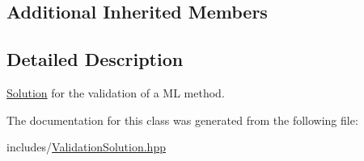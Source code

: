 \subsection*{Additional Inherited Members}


\subsection{Detailed Description}
\hyperlink{class_solution}{Solution} for the validation of a ML method. 

The documentation for this class was generated from the following file\+:\begin{DoxyCompactItemize}
\item 
includes/\hyperlink{_validation_solution_8hpp}{Validation\+Solution.\+hpp}\end{DoxyCompactItemize}

